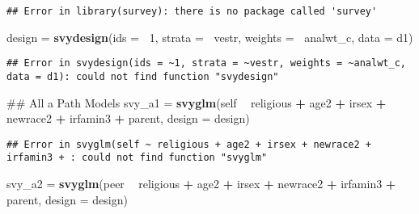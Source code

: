 \documentclass[]{article}
\newenvironment{Shaded}{\begin{snugshade}}{\end{snugshade}}
\newcommand{\KeywordTok}[1]{\textcolor[rgb]{0.13,0.29,0.53}{\textbf{#1}}}
\newcommand{\DataTypeTok}[1]{\textcolor[rgb]{0.13,0.29,0.53}{#1}}
\newcommand{\DecValTok}[1]{\textcolor[rgb]{0.00,0.00,0.81}{#1}}
\newcommand{\StringTok}[1]{\textcolor[rgb]{0.31,0.60,0.02}{#1}}
\newcommand{\OperatorTok}[1]{\textcolor[rgb]{0.81,0.36,0.00}{\textbf{#1}}}
\newcommand{\NormalTok}[1]{#1}
\begin{document}
\begin{verbatim}
## Error in library(survey): there is no package called 'survey'
\end{verbatim}

\begin{Shaded}
\begin{Highlighting}[]
\NormalTok{design =}\StringTok{ }\KeywordTok{svydesign}\NormalTok{(}\DataTypeTok{ids =} \OperatorTok{~}\DecValTok{1}\NormalTok{, }
                   \DataTypeTok{strata =} \OperatorTok{~}\NormalTok{vestr, }
                   \DataTypeTok{weights =} \OperatorTok{~}\NormalTok{analwt_c,}
                   \DataTypeTok{data =}\NormalTok{ d1)}
\end{Highlighting}
\end{Shaded}

\begin{verbatim}
## Error in svydesign(ids = ~1, strata = ~vestr, weights = ~analwt_c, data = d1): could not find function "svydesign"
\end{verbatim}

\begin{Shaded}
\begin{Highlighting}[]
\NormalTok{## All a Path Models}
\NormalTok{svy_a1 =}\StringTok{ }\KeywordTok{svyglm}\NormalTok{(self }\OperatorTok{~}\StringTok{ }\NormalTok{religious }\OperatorTok{+}\StringTok{ }\NormalTok{age2 }\OperatorTok{+}\StringTok{ }
\StringTok{                  }\NormalTok{irsex }\OperatorTok{+}\StringTok{ }\NormalTok{newrace2 }\OperatorTok{+}\StringTok{ }\NormalTok{irfamin3 }\OperatorTok{+}\StringTok{ }\NormalTok{parent, }
                \DataTypeTok{design =}\NormalTok{ design)}
\end{Highlighting}
\end{Shaded}

\begin{verbatim}
## Error in svyglm(self ~ religious + age2 + irsex + newrace2 + irfamin3 + : could not find function "svyglm"
\end{verbatim}

\begin{Shaded}
\begin{Highlighting}[]
\NormalTok{svy_a2 =}\StringTok{ }\KeywordTok{svyglm}\NormalTok{(peer }\OperatorTok{~}\StringTok{ }\NormalTok{religious }\OperatorTok{+}\StringTok{ }\NormalTok{age2 }\OperatorTok{+}\StringTok{ }
\StringTok{                  }\NormalTok{irsex }\OperatorTok{+}\StringTok{ }\NormalTok{newrace2 }\OperatorTok{+}\StringTok{ }\NormalTok{irfamin3 }\OperatorTok{+}\StringTok{ }\NormalTok{parent, }
                \DataTypeTok{design =}\NormalTok{ design)}
\end{Highlighting}
\end{Shaded}
\end{document}
